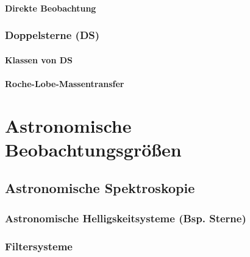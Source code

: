 \subsection{Direkte Beobachtung}

\section[Doppelsterne]{Doppelsterne (DS)}
\subsection{Klassen von DS}
\subsection{Roche-Lobe-Massentransfer}

\part{Astronomische Beobachtungsgrößen}
\chapter{Astronomische Spektroskopie}
\section[Astronomische Helligskeitsysteme]{Astronomische Helligskeitsysteme (Bsp. Sterne)}
\section{Filtersysteme}
